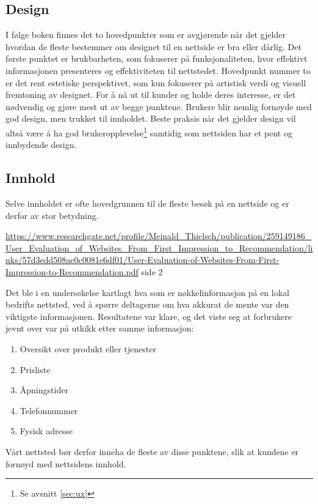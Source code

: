 \subsection{Design}
\label{sec:design}
I følge boken  \cite[s.~5]{beaird2014tpo} finnes det to hovedpunkter som er avgjørende når det gjelder hvordan de fleste bestemmer om designet til en nettside er bra eller dårlig. Det første punktet er brukbarheten, som fokuserer på funksjonaliteten, hvor effektivt informasjonen presenteres og effektiviteten til nettstedet. Hovedpunkt nummer to er det rent estetiske perspektivet, som kun fokuserer på artistisk verdi og visuell fremtoning av designet. For å nå ut til kunder og holde deres interesse, er det nødvendig og gjøre mest ut av begge punktene. Brukere blir nemlig fornøyde med god design, men trukket til innholdet.  Beste praksis når det gjelder design vil altså være å ha god brukeropplevelse\footnote{Se avsnitt \ref{sec:ux}} samtidig som nettsiden har et pent og innbydende design.

\subsection{Innhold}
Selve innholdet er ofte hovedgrunnen til de fleste besøk på en nettside og er derfor av stor betydning.

 \url{https://www.researchgate.net/profile/Meinald_Thielsch/publication/259149186_User_Evaluation_of_Websites_From_First_Impression_to_Recommendation/links/57d3edd508ae0c0081e6df01/User-Evaluation-of-Websites-From-First-Impression-to-Recommendation.pdf} side 2

Det ble i en undersøkelse \cite{marchant18wdc} kartlagt hva som er nøkkelinformasjon på en lokal bedrifts nettsted, ved å spørre deltagerne om hva akkurat de mente var den viktigste informasjonen. Resultatene var klare, og det viste seg at forbrukere jevnt over var på utkikk etter samme informasjon:
\begin{enumerate}
\item  Oversikt over produkt eller tjenester
\item  Prisliste
\item  Åpningstider
\item Telefonnummer
\item Fysisk adresse
\end{enumerate}

Vårt nettsted bør derfor inneha de fleste av disse punktene, slik at kundene er fornøyd med nettsidens innhold.



